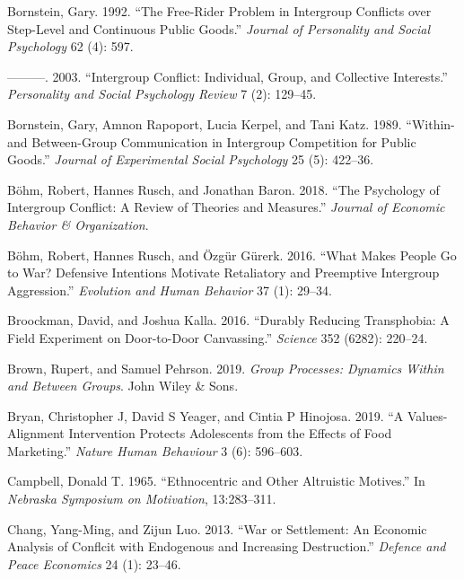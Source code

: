 \documentclass[11pt]{article}
\begin{document}
\leavevmode\hypertarget{ref-bornstein1992free}{}%
Bornstein, Gary. 1992. ``The Free-Rider Problem in Intergroup Conflicts
over Step-Level and Continuous Public Goods.'' \emph{Journal of
Personality and Social Psychology} 62 (4): 597.

\leavevmode\hypertarget{ref-bornstein2003intergroup}{}%
---------. 2003. ``Intergroup Conflict: Individual, Group, and
Collective Interests.'' \emph{Personality and Social Psychology Review}
7 (2): 129--45.

\leavevmode\hypertarget{ref-bornstein1989within}{}%
Bornstein, Gary, Amnon Rapoport, Lucia Kerpel, and Tani Katz. 1989.
``Within-and Between-Group Communication in Intergroup Competition for
Public Goods.'' \emph{Journal of Experimental Social Psychology} 25 (5):
422--36.

\leavevmode\hypertarget{ref-bohm2018psychology}{}%
Böhm, Robert, Hannes Rusch, and Jonathan Baron. 2018. ``The Psychology
of Intergroup Conflict: A Review of Theories and Measures.''
\emph{Journal of Economic Behavior \& Organization}.

\leavevmode\hypertarget{ref-bohm2016makes}{}%
Böhm, Robert, Hannes Rusch, and Özgür Gürerk. 2016. ``What Makes People
Go to War? Defensive Intentions Motivate Retaliatory and Preemptive
Intergroup Aggression.'' \emph{Evolution and Human Behavior} 37 (1):
29--34.

\leavevmode\hypertarget{ref-broockman2016durably}{}%
Broockman, David, and Joshua Kalla. 2016. ``Durably Reducing
Transphobia: A Field Experiment on Door-to-Door Canvassing.''
\emph{Science} 352 (6282): 220--24.

\leavevmode\hypertarget{ref-brown2019group}{}%
Brown, Rupert, and Samuel Pehrson. 2019. \emph{Group Processes: Dynamics
Within and Between Groups}. John Wiley \& Sons.

\leavevmode\hypertarget{ref-bryan2019values}{}%
Bryan, Christopher J, David S Yeager, and Cintia P Hinojosa. 2019. ``A
Values-Alignment Intervention Protects Adolescents from the Effects of
Food Marketing.'' \emph{Nature Human Behaviour} 3 (6): 596--603.

\leavevmode\hypertarget{ref-campbell1965ethno}{}%
Campbell, Donald T. 1965. ``Ethnocentric and Other Altruistic Motives.''
In \emph{Nebraska Symposium on Motivation}, 13:283--311.

\leavevmode\hypertarget{ref-chang2013war}{}%
Chang, Yang-Ming, and Zijun Luo. 2013. ``War or Settlement: An Economic
Analysis of Conflcit with Endogenous and Increasing Destruction.''
\emph{Defence and Peace Economics} 24 (1): 23--46.
\end{document}
